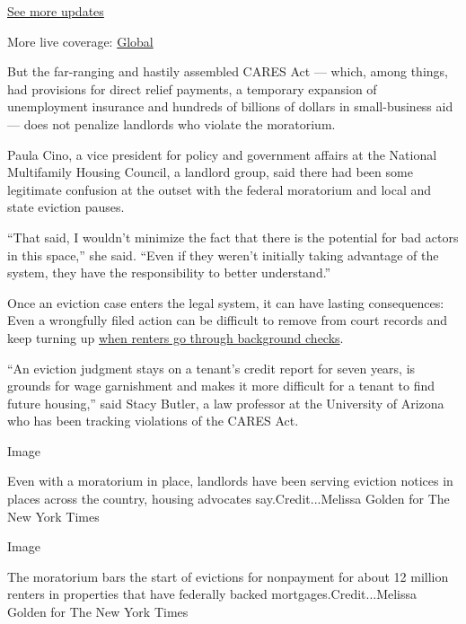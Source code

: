 \href{https://www.nytimes3xbfgragh.onion/live/2020/08/04/business/stock-market-today-coronavirus?action=click\&pgtype=Article\&state=default\&region=MAIN_CONTENT_1\&context=storylines_live_updates}{See
more updates}

More live coverage:
\href{https://www.nytimes3xbfgragh.onion/2020/08/04/world/coronavirus-cases.html?action=click\&pgtype=Article\&state=default\&region=MAIN_CONTENT_1\&context=storylines_live_updates}{Global}

But the far-ranging and hastily assembled CARES Act --- which, among
things, had provisions for direct relief payments, a temporary expansion
of unemployment insurance and hundreds of billions of dollars in
small-business aid --- does not penalize landlords who violate the
moratorium.

Paula Cino, a vice president for policy and government affairs at the
National Multifamily Housing Council, a landlord group, said there had
been some legitimate confusion at the outset with the federal moratorium
and local and state eviction pauses.

``That said, I wouldn't minimize the fact that there is the potential
for bad actors in this space,'' she said. ``Even if they weren't
initially taking advantage of the system, they have the responsibility
to better understand.''

Once an eviction case enters the legal system, it can have lasting
consequences: Even a wrongfully filed action can be difficult to remove
from court records and keep turning up
\href{https://www.nytimes3xbfgragh.onion/2020/05/28/business/renters-background-checks.html}{when
renters go through background checks}.

``An eviction judgment stays on a tenant's credit report for seven
years, is grounds for wage garnishment and makes it more difficult for a
tenant to find future housing,'' said Stacy Butler, a law professor at
the University of Arizona who has been tracking violations of the CARES
Act.

Image

Even with a moratorium in place, landlords have been serving eviction
notices in places across the country, housing advocates
say.Credit...Melissa Golden for The New York Times

Image

The moratorium bars the start of evictions for nonpayment for about 12
million renters in properties that have federally backed
mortgages.Credit...Melissa Golden for The New York Times

